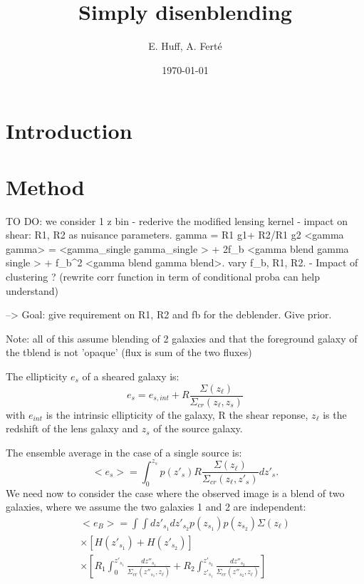 \documentclass[prd,amsmath,aps,floats,amssymb, floatfix, superscriptaddress,nofootinbib,preprintnumbers,twocolumn]{article}  %
\title{Simply disenblending}
\date{\today}
\author{E. Huff, A. Fert\'e}
\begin{document}
\maketitle



\section{Introduction}
\label{sec:intro}

\section{Method}
\label{sec:method}

TO DO: we consider 1 z bin
- rederive the modified lensing kernel
- impact on shear: R1, R2 as nuisance parameters.
gamma = R1 g1+ R2/R1 g2
<gamma gamma> = <gamma_single gamma_single > + 2f_b <gamma blend gamma single > + f_b^2 <gamma blend gamma blend>.
vary f_b, R1, R2. 
- Impact of clustering ? (rewrite corr function in term of conditional proba can help understand) 

--> Goal: give requirement on R1, R2 and fb for the deblender. Give prior. 


Note: all of this assume blending of 2 galaxies and that the foreground galaxy of the tblend is not 'opaque' (flux is sum of the two fluxes) 

The ellipticity $e_s$ of a sheared galaxy is: 
\begin{equation}
e_s = e_{s,int} + R \frac{\Sigma (z_{\ell})}{\Sigma_{cr}(z_{\ell},z_s)}
\end{equation}
with $e_{int}$ is the intrinsic ellipticity of the galaxy, R the shear reponse, $z_{\ell}$ is the redshift of the lens galaxy and $z_s$ of the source galaxy.

The ensemble average in the case of a single source is: 
\begin{equation}
<e_s> = \int_0^{z_s} p(z'_s) R \frac{\Sigma (z_{\ell})}{\Sigma_{cr}(z_{\ell},z'_s)} dz'_s.
\end{equation}
We need now to consider the case where the observed image is a blend of two galaxies, where we assume the two galaxies 1 and 2 are independent: 
\begin{multline}
<e_B>  = \int \int dz'_{s_1} dz'_{s_2} p(z_{s_1})p(z_{s_2}) \Sigma(z_{\ell}) \\
\times [H(z'_{s_1}) + H(z'_{s_2})]  \\
\times [ R_1 \int_0^{z'_{s_1}} \frac{dz''_{s_1}}{\Sigma_{cr}(z''_{s_1},z_{\ell})} 
+ R_2 \int_{z'_{s_1}}^{z'_{s_2}} \frac{dz''_{s_2}}{\Sigma_{cr}(z''_{s_2},z_{\ell})}  ]
\label{eq:ellblend}
\end{multline}
\end{document}

